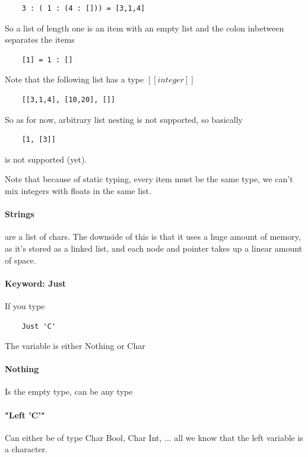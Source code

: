 \documentclass[12pt]{article}
\begin{document}
\begin{lstlisting}
	3 : ( 1 : (4 : [])) = [3,1,4]
\end{lstlisting}

So a list of length one is an item with an empty list and the colon inbetween separates the items
\begin{lstlisting}
	[1] = 1 : []
\end{lstlisting}

Note that the following list has a type $[[integer]]$

\begin{lstlisting}
	[[3,1,4], [10,20], []]
\end{lstlisting}

So as for now, arbitrary list nesting is not supported, so basically

\begin{lstlisting}
	[1, [3]]
\end{lstlisting}

is not supported (yet).

Note that because of static typing, every item must be the same type, we can't mix integers with floats in the same list.

\paragraph{Strings} are a list of chars. The downside of this is that it uses a huge amount of memory, as it's stored as a linked list, and each node and pointer takes up a linear amount of space.

\paragraph{Keyword: Just} If you type

\begin{lstlisting}
	Just 'C'
\end{lstlisting}

The variable is either Nothing or Char

\paragraph{Nothing} Is the empty type, can be any type

\paragraph{"Left 'C'"} Can either be of type Char Bool, Char Int,  ... all we know that the left variable is a character.
\end{document}
